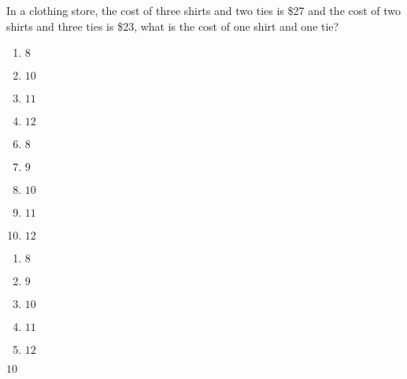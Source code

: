 


 In a clothing store, the cost of
three shirts and two ties is \$27 and the cost
of two shirts and three ties is \$23, what is
the cost of one shirt and one tie?


\ifsat
	\begin{enumerate}[label=\Alph*)]
		\item   $8$
		\item   $10$%
		\item   $11$
		\item    $12$
	\end{enumerate}
\else
\fi

\ifacteven
	\begin{enumerate}[label=\textbf{\Alph*.},itemsep=\fill,align=left]
		\setcounter{enumii}{5}
		\item   $8$
		\item   $9$
		\item   $10$%
		\addtocounter{enumii}{1}
		\item   $11$
		\item    $12$
	\end{enumerate}
\else
\fi

\ifactodd
	\begin{enumerate}[label=\textbf{\Alph*.},itemsep=\fill,align=left]
		\item   $8$
		\item   $9$
		\item   $10$%
		\item   $11$
		\item    $12$
	\end{enumerate}
\else
\fi

\ifgridin
   $10$%
		
\else
\fi

